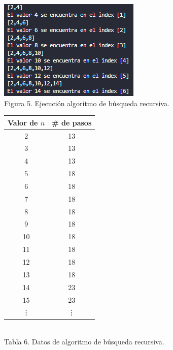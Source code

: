 \documentclass[12pt,twoside]{article}
\begin{document}
\begin{minipage}{.45\linewidth}
  \centering
  \includegraphics[width=1\linewidth]{images/busquedarecursiva.png}
  \\
  Figura 5. Ejecución algoritmo de búsqueda recursiva.
\end{minipage}\hfill
\begin{minipage}{.45\linewidth}
  \centering
  \begin{tabular}{|c|c|}
    \hline
    \textbf{Valor de $n$} & \textbf{\# de pasos} \\
    \hline
    2  & 13 \\
    3  & 13 \\
    4  & 13 \\
    5  & 18 \\
    6  & 18 \\
    7  & 18 \\
    8  & 18 \\
    9  & 18 \\
    10 & 18 \\
    11 & 18 \\
    12 & 18 \\
    13 & 18 \\
    14 & 23 \\
    15 & 23 \\
    \vdots & \vdots\\
    \hline
  \end{tabular}
  \\
  Tabla 6. Datos de algoritmo de búsqueda recursiva.
\end{minipage}

\medskip
\end{document}

